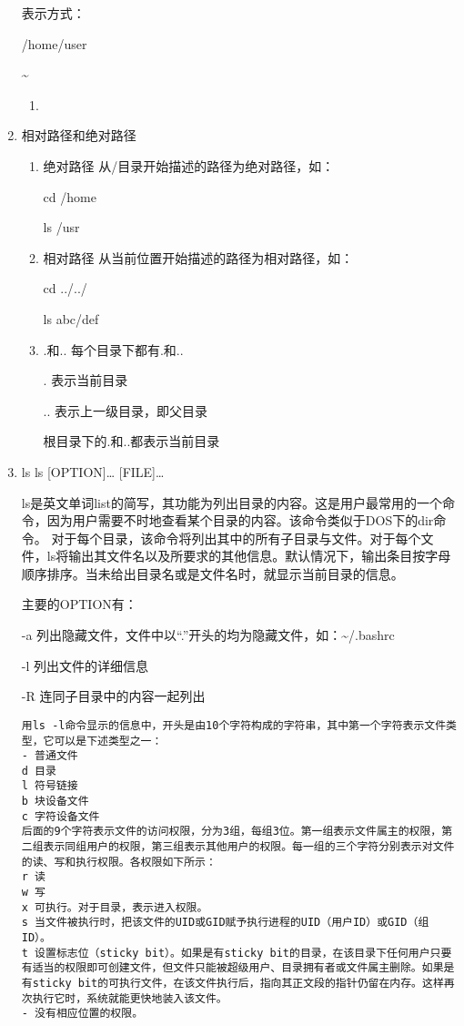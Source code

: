 \documentclass[11pt]{article}
\begin{document}
\begin{enumerate}
表示方式：

/home/user

\textasciitilde{}

\begin{enumerate}
\item 
\label{sec-1-1-2-2-1}
\end{enumerate}
\item 相对路径和绝对路径
\label{sec-1-1-2-3}
\begin{enumerate}
\item 绝对路径
\label{sec-1-1-2-3-1}
从/目录开始描述的路径为绝对路径，如：

cd /home

ls /usr
\item 相对路径
\label{sec-1-1-2-3-2}
从当前位置开始描述的路径为相对路径，如：

cd ../../

ls abc/def
\item .和..
\label{sec-1-1-2-3-3}
每个目录下都有.和..

. 表示当前目录

.. 表示上一级目录，即父目录

根目录下的.和..都表示当前目录
\end{enumerate}
\item ls
\label{sec-1-1-2-4}
ls [OPTION]\ldots{} [FILE]\ldots{}

ls是英文单词list的简写，其功能为列出目录的内容。这是用户最常用的一个命令，因为用户需要不时地查看某个目录的内容。该命令类似于DOS下的dir命令。 
对于每个目录，该命令将列出其中的所有子目录与文件。对于每个文件，ls将输出其文件名以及所要求的其他信息。默认情况下，输出条目按字母顺序排序。当未给出目录名或是文件名时，就显示当前目录的信息。 

主要的OPTION有： 

-a 列出隐藏文件，文件中以“.”开头的均为隐藏文件，如：\textasciitilde{}/.bashrc 

-l 列出文件的详细信息 

-R 连同子目录中的内容一起列出 

\begin{verbatim}
用ls -l命令显示的信息中，开头是由10个字符构成的字符串，其中第一个字符表示文件类型，它可以是下述类型之一： 
- 普通文件 
d 目录 
l 符号链接 
b 块设备文件 
c 字符设备文件 
后面的9个字符表示文件的访问权限，分为3组，每组3位。第一组表示文件属主的权限，第二组表示同组用户的权限，第三组表示其他用户的权限。每一组的三个字符分别表示对文件的读、写和执行权限。各权限如下所示： 
r 读 
w 写 
x 可执行。对于目录，表示进入权限。 
s 当文件被执行时，把该文件的UID或GID赋予执行进程的UID（用户ID）或GID（组 ID）。 
t 设置标志位（sticky bit）。如果是有sticky bit的目录，在该目录下任何用户只要有适当的权限即可创建文件，但文件只能被超级用户、目录拥有者或文件属主删除。如果是有sticky bit的可执行文件，在该文件执行后，指向其正文段的指针仍留在内存。这样再次执行它时，系统就能更快地装入该文件。 
- 没有相应位置的权限。


\end{verbatim}
\end{enumerate}
\end{document}
